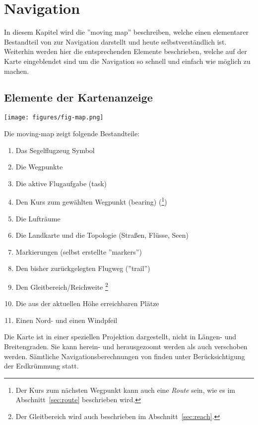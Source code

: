 \chapter{Navigation}\label{cha:navigation}

In diesem Kapitel wird die ''moving map'' beschreiben, welche einen elementarer Bestandteil von \xc zur Navigation darstellt und heute selbstverständlich ist. Weiterhin werden hier die entsprechenden Elemente beschrieben, welche auf der Karte eingeblendet sind um die Navigation so schnell und einfach wie möglich zu machen.

\section{Elemente der Kartenanzeige}

\begin{maxipage}\centering
\texttt{[image: figures/fig-map.png]}
\end{maxipage}

Die moving-map zeigt folgende Bestandteile:

\begin{enumerate}[itemsep=-0.25ex]
  \item Das Segelflugzeug Symbol
  \item Die Wegpunkte
  \item Die aktive Flugaufgabe (task)
  \item Den Kurs zum gewählten Wegpunkt (bearing)
     (\footnote{Der Kurs zum nächsten Wegpunkt kann auch eine {\em Route} sein, wie es im Abschnitt~\ref{sec:route} beschrieben wird.})
    \item Die Lufträume
  \item Die Landkarte und die Topologie (Straßen, Flüsse, Seen)
  \item Markierungen (selbst erstellte ''markers'')
  \item Den bisher zurückgelegten Flugweg (''trail'')
  \item Den Gleitbereich/Reichweite \footnote{Der Gleitbereich wird auch beschrieben im Abschnitt~\ref{sec:reach}.}
  \item Die aus der aktuellen Höhe erreichbaren Plätze
  \item Einen Nord-  und einen Windpfeil
\end{enumerate}

Die Karte ist in einer speziellen Projektion dargestellt, nicht in Längen- und Breitengraden. Sie kann herein- und herausgezoomt werden als auch verschoben werden. Sämtliche Navigationsberechnungen von \xc finden unter Berücksichtigung der Erdkrümmung statt.

